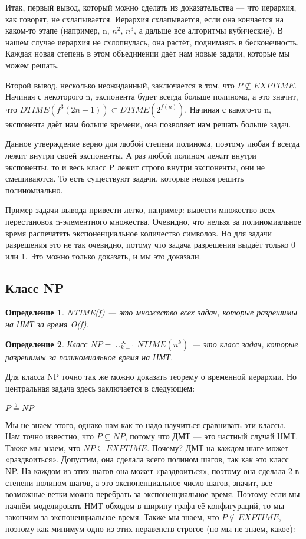 \documentclass[a4paper]{article}
\newtheorem{definition}{Определение}
\begin{document}
{Итак, первый вывод, который можно сделать из доказательства — что иерархия, как говорят, не схлапывается. Иерархия схлапывается, если она кончается на каком-то этапе (например, n, $n^2$, $n^3$, а дальше все алгоритмы кубические). В нашем случае иерархия не схлопнулась, она растёт, поднимаясь в бесконечность. Каждая новая степень в этом объединении даёт нам новые задачи, которые мы можем решать.

Второй вывод, несколько неожиданный, заключается в том, что $P \nsubseteq EXPTIME$. Начиная с некоторого n, экспонента будет всегда больше полинома, а это значит, что $DTIME(f^3(2n + 1)) \subset DTIME(2^{f(n)})$. Начиная с какого-то n, экспонента даёт нам больше времени, она позволяет нам решать больше задач. 

Данное утверждение верно для любой степени полинома, поэтому любая f всегда лежит внутри своей экспоненты. А раз любой полином лежит внутри экспоненты, то и весь класс P лежит строго внутри экспоненты, они не смешиваются. То есть существуют задачи, которые нельзя решить полиномиально. 

Пример задачи вывода привести легко, например: вывести множество всех перестановок n-элементного множества. Очевидно, что нельзя за полиномиальное время распечатать экспоненциальное количество символов. Но для задачи разрешения это не так очевидно, потому что задача разрешения выдаёт только 0 или 1. Это можно только доказать, и мы это доказали. 

\subsection{Класс NP}

\begin{definition} NTIME(f) — это множество всех задач, которые разрешимы на НМТ за время O(f).
\end{definition}

\begin{definition} Класс $NP = \cup_{k=1}^{\infty}NTIME(n^{k})$ — это класс задач, которые разрешимы за полиномиальное время на НМТ.
\end{definition}

Для класса NP точно так же можно доказать теорему о временной иерархии. Но центральная задача здесь заключается в следующем:

$P\overset{?}{=}NP$

Мы не знаем этого, однако нам как-то надо научиться сравнивать эти классы. Нам точно известно, что $P \subseteq NP$, потому что ДМТ — это частный случай НМТ. Также мы знаем, что $NP \subseteq EXPTIME$. Почему? ДМТ на каждом шаге может «раздвоиться». Допустим, она сделала всего полином шагов, так как это класс NP. На каждом из этих шагов она может «раздвоиться», поэтому она сделала 2 в степени полином шагов, а это экспоненциальное число шагов, значит, все возможные ветки можно перебрать за экспоненциальное время. Поэтому если мы начнём моделировать НМТ обходом в ширину графа её конфигураций, то мы закончим за экспоненциальное время. Также мы знаем, что $P \nsubseteq EXPTIME$, поэтому как минимум одно из этих неравенств строгое (но мы не знаем, какое):

}
\end{document}
